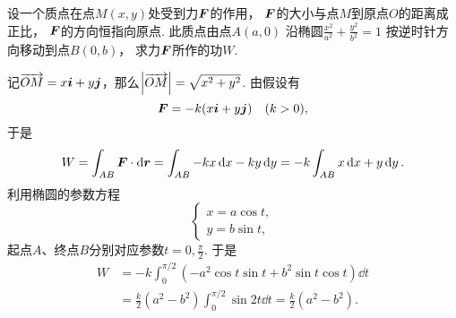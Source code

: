 \begin{example}
设一个质点在点\(M(x,y)\)处受到力\(\boldsymbol{F}\)的作用，
\(\boldsymbol{F}\)的大小与点\(M\)到原点\(O\)的距离成正比，
\(\boldsymbol{F}\)的方向恒指向原点.
此质点由点\(A(a,0)\)
沿椭圆\(\frac{x^2}{a^2}+\frac{y^2}{b^2}=1\)
按逆时针方向移动到点\(B(0,b)\)，
求力\(\boldsymbol{F}\)所作的功\(W\).
\begin{solution}
记\(\overrightarrow{OM} = x\boldsymbol{i}+y\boldsymbol{j}\)，那么\(\abs{\overrightarrow{OM}} = \sqrt{x^2+y^2}\).
由假设有\[
	\boldsymbol{F} = -k(x\boldsymbol{i}+y\boldsymbol{j}) \quad (k>0),
\]
于是\[
	W = \int_{AB} \boldsymbol{F} \cdot \dd{\boldsymbol{r}}
	= \int_{AB} -kx\dd{x}-ky\dd{y}
	= -k \int_{AB} x\dd{x}+y\dd{y}.
\]
利用椭圆的参数方程\[
	\begin{cases}
		x = a \cos t, \\
		y = b \sin t,
	\end{cases}
\]
起点\(A\)、终点\(B\)分别对应参数\(t = 0,\frac{\pi}{2}\).
于是\begin{align*}
	W &= -k \int_0^{\pi/2} (-a^2 \cos t \sin t + b^2 \sin t \cos t) \dd{t} \\
	&= \frac{k}{2}(a^2-b^2) \int_0^{\pi/2} \sin 2t \dd{t}
	= \frac{k}{2}(a^2-b^2).
\end{align*}
\end{solution}
\end{example}

